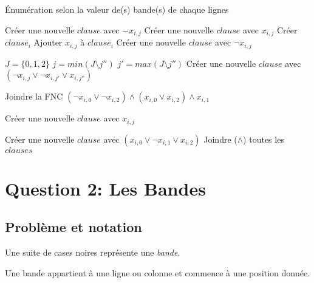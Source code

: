 \documentclass[a4paper,12pt]{report}
\begin{document}
\begin{algorithm}
\caption{Énumération selon la valeur de(s) bande(s) de chaque lignes}
\begin{algorithmic}
		 
				\State Créer une nouvelle $clause$ avec $-x_{i,j}$
				\State Créer une nouvelle $clause$ avec $x_{i,j}$
			\EndIf
		\EndFor
		 
				\State Créer $clause_i$
			\EndIf
			\State Ajouter $x_{i,j}$ à $clause_i$ 
		\EndFor
			 
					\State	Créer une nouvelle $clause$ avec $\lnot x_{i,j} $
				\EndFor
	
			 
			\State $J=\{0,1,2\}$
					\State $j=min(J\setminus j'')$
					\State $j'=max(J\setminus j'')$ 
					\State Créer une nouvelle $clause$ avec $(\lnot x_{i,j}\vee \lnot x_{i,j'} \vee x_{i,j''} )$ 
				\EndFor
							
			 
				\State Joindre la FNC $(\lnot x_{i,0} \vee \lnot x_{i,2}) \wedge (x_{i,0} \vee x_{i,2}) \wedge x_{i,1}$
							
			 
							\State Créer une nouvelle $clause$ avec $x_{i,j}$
				\EndFor
							
			\EndIf
			\State Créer une nouvelle $clause$ avec $(x_{i,0} \vee \lnot x_{i,1} \vee x_{i,2})$
		\EndIf			 
		\State Joindre ($\wedge$) toutes les $clauses$
\EndFor
\end{algorithmic}
\end{algorithm}


\chapter{Question 2: Les Bandes}
\section{Problème et notation}

Une suite de cases noires représente une \textit{bande}. 

Une bande appartient à une ligne ou colonne et commence à une position donnée. 
\end{document}
